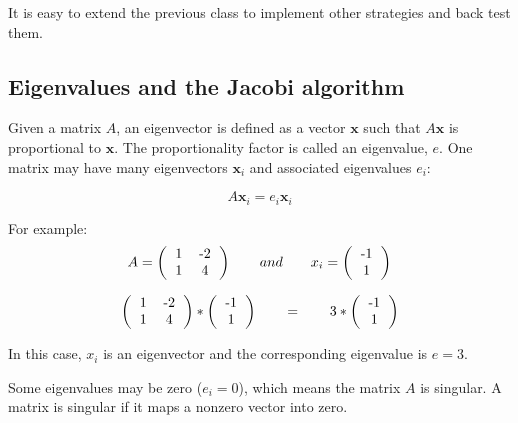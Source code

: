 \documentclass[justified, sixbynine]{tufte-book}
\theoremstyle{plain}%
\newtheorem * {corollary}{Corollary}
\theoremstyle{definition}
\theoremstyle{remark}
\newtheorem * {remark}{Remark}
\newtheorem * {note}{Note}
\begin{document}
\begin{fullwidth}
It is easy to extend the previous class to implement other strategies and back test them.

\goodbreak\subsection{Eigenvalues and the Jacobi algorithm}


Given a matrix $A$, an eigenvector is defined as a vector $\mathbf{x}$ such that
$A\mathbf{x}$ is proportional to $\mathbf{x}$.
The proportionality factor is called an eigenvalue, $e$. One matrix may have many eigenvectors $\mathbf{x}_i$ and associated eigenvalues $e_i$:

\begin{equation}
A\mathbf{x}_i = e_i\mathbf{x}_i
\end{equation}

For example:
\begin{equation}
A = \left(\begin{tabular}{ccc}
1 & -2  \\
1 & 4  \\
\end{tabular}\right) \qquad and \qquad
x_i =
\left(\begin{tabular}{c}
-1 \\
1 \\
\end{tabular}\right)
\end{equation}

\begin{equation}
\left(\begin{tabular}{ccc}
1 & -2  \\
1 & 4  \\
\end{tabular}\right) * 
\left(\begin{tabular}{c}
-1 \\
1 \\
\end{tabular}\right) \qquad =  \qquad
3 * \left(\begin{tabular}{c}
-1 \\
1 \\
\end{tabular}\right)
\end{equation}

In this case, $x_i$ is an eigenvector and the corresponding eigenvalue is $e=3$.

Some eigenvalues may be zero ($e_i=0$), which means the matrix $A$ is singular. A matrix is singular if it maps a nonzero vector into zero.


\end{fullwidth}
\end{document}
